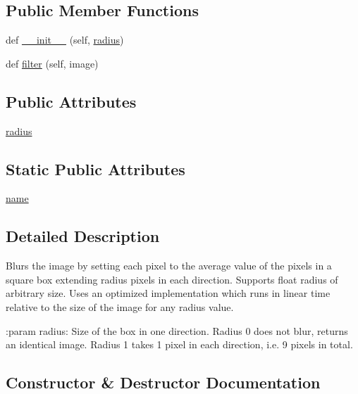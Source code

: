 \subsection*{Public Member Functions}
\begin{DoxyCompactItemize}
\item 
def \hyperlink{classPIL_1_1ImageFilter_1_1BoxBlur_a2d181412dd3b81932dd127acbdfc17f9}{\+\_\+\+\_\+init\+\_\+\+\_\+} (self, \hyperlink{classPIL_1_1ImageFilter_1_1BoxBlur_a26a090753606f60baa94f7c9e36b4a2d}{radius})
\item 
def \hyperlink{classPIL_1_1ImageFilter_1_1BoxBlur_af4c9cf011d360e75f3fb99a184658316}{filter} (self, image)
\end{DoxyCompactItemize}
\subsection*{Public Attributes}
\begin{DoxyCompactItemize}
\item 
\hyperlink{classPIL_1_1ImageFilter_1_1BoxBlur_a26a090753606f60baa94f7c9e36b4a2d}{radius}
\end{DoxyCompactItemize}
\subsection*{Static Public Attributes}
\begin{DoxyCompactItemize}
\item 
\hyperlink{classPIL_1_1ImageFilter_1_1BoxBlur_af54502af36f37e766e46c00e9786b740}{name}
\end{DoxyCompactItemize}


\subsection{Detailed Description}
\begin{DoxyVerb}Blurs the image by setting each pixel to the average value of the pixels
in a square box extending radius pixels in each direction.
Supports float radius of arbitrary size. Uses an optimized implementation
which runs in linear time relative to the size of the image
for any radius value.

:param radius: Size of the box in one direction. Radius 0 does not blur,
               returns an identical image. Radius 1 takes 1 pixel
               in each direction, i.e. 9 pixels in total.
\end{DoxyVerb}
 

\subsection{Constructor \& Destructor Documentation}
\mbox{\label{classPIL_1_1ImageFilter_1_1BoxBlur_a2d181412dd3b81932dd127acbdfc17f9}} 
